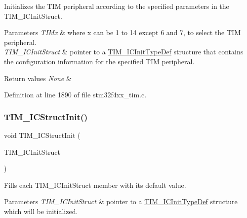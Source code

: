Initializes the T\+IM peripheral according to the specified parameters in the T\+I\+M\+\_\+\+I\+C\+Init\+Struct. 


\begin{DoxyParams}{Parameters}
{\em T\+I\+Mx} & where x can be 1 to 14 except 6 and 7, to select the T\+IM peripheral. \\
\hline
{\em T\+I\+M\+\_\+\+I\+C\+Init\+Struct} & pointer to a \hyperlink{struct_t_i_m___i_c_init_type_def}{T\+I\+M\+\_\+\+I\+C\+Init\+Type\+Def} structure that contains the configuration information for the specified T\+IM peripheral. \\
\hline
\end{DoxyParams}

\begin{DoxyRetVals}{Return values}
{\em None} & \\
\hline
\end{DoxyRetVals}


Definition at line 1890 of file stm32f4xx\+\_\+tim.\+c.

\mbox{\label{group___t_i_m___group3_ga5005dac8e4e8a4c7fc2a0ef05b77cc50}} 
\subsubsection{\texorpdfstring{T\+I\+M\+\_\+\+I\+C\+Struct\+Init()}{TIM\_ICStructInit()}}
{\footnotesize\ttfamily void T\+I\+M\+\_\+\+I\+C\+Struct\+Init (\begin{DoxyParamCaption}\item[{\hyperlink{struct_t_i_m___i_c_init_type_def}{T\+I\+M\+\_\+\+I\+C\+Init\+Type\+Def} $\ast$}]{T\+I\+M\+\_\+\+I\+C\+Init\+Struct }\end{DoxyParamCaption})}



Fills each T\+I\+M\+\_\+\+I\+C\+Init\+Struct member with its default value. 


\begin{DoxyParams}{Parameters}
{\em T\+I\+M\+\_\+\+I\+C\+Init\+Struct} & pointer to a \hyperlink{struct_t_i_m___i_c_init_type_def}{T\+I\+M\+\_\+\+I\+C\+Init\+Type\+Def} structure which will be initialized. \\
\hline
\end{DoxyParams}


